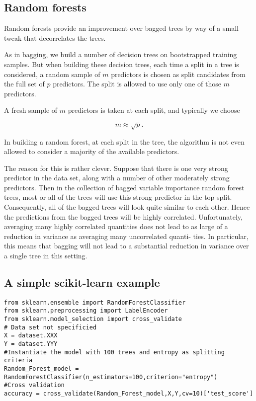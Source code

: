 \documentclass[%
oneside,                 %
final,                   %
10pt]{article}
\begin{document}
\subsection*{Random forests}

Random forests provide an improvement over bagged trees by way of a
small tweak that decorrelates the trees. 

As in bagging, we build a
number of decision trees on bootstrapped training samples. But when
building these decision trees, each time a split in a tree is
considered, a random sample of $m$ predictors is chosen as split
candidates from the full set of $p$ predictors. The split is allowed to
use only one of those $m$ predictors. 

A fresh sample of $m$ predictors is
taken at each split, and typically we choose 

\[
m\approx \sqrt{p}.
\]

In building a random forest, at
each split in the tree, the algorithm is not even allowed to consider
a majority of the available predictors. 

The reason for this is rather clever. Suppose that there is one very
strong predictor in the data set, along with a number of other
moderately strong predictors. Then in the collection of bagged
variable importance random forest trees, most or all of the trees will
use this strong predictor in the top split. Consequently, all of the
bagged trees will look quite similar to each other. Hence the
predictions from the bagged trees will be highly correlated.
Unfortunately, averaging many highly correlated quantities does not
lead to as large of a reduction in variance as averaging many
uncorrelated quanti- ties. In particular, this means that bagging will
not lead to a substantial reduction in variance over a single tree in
this setting.

\subsection*{A simple scikit-learn example}
\begin{verbatim}
from sklearn.ensemble import RandomForestClassifier
from sklearn.preprocessing import LabelEncoder
from sklearn.model_selection import cross_validate
# Data set not specificied
X = dataset.XXX
Y = dataset.YYY
#Instantiate the model with 100 trees and entropy as splitting criteria
Random_Forest_model = RandomForestClassifier(n_estimators=100,criterion="entropy")
#Cross validation
accuracy = cross_validate(Random_Forest_model,X,Y,cv=10)['test_score']
\end{verbatim}
\end{document}
